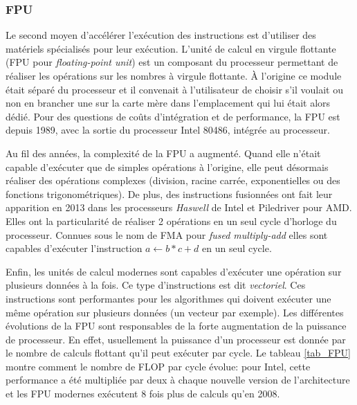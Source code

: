 \subsubsection{FPU}\label{sec:fpu}

Le second moyen d'accélérer l'exécution des instructions est d'utiliser des matériels spécialisés pour leur exécution. L'unité de calcul en virgule flottante (FPU pour \textit{floating-point  unit}) est un composant du processeur permettant de réaliser les opérations sur les nombres à virgule flottante. À l'origine ce module était séparé du processeur et il convenait à l'utilisateur de choisir s’il voulait ou non en brancher une sur la carte mère dans l'emplacement qui lui était alors dédié. Pour des questions de coûts d'intégration et de performance, la FPU est depuis 1989, avec la sortie du processeur Intel 80486,  intégrée au processeur. 

Au fil des années, la complexité de la FPU a augmenté. Quand elle n'était capable d'exécuter que de simples opérations à l'origine, elle peut désormais réaliser des opérations complexes (division, racine carrée, exponentielles ou des fonctions trigonométriques).  De plus, des instructions fusionnées ont fait leur apparition en 2013 dans les processeurs \textit{Haswell} de Intel et Piledriver pour AMD. Elles ont la particularité de réaliser 2 opérations en un seul cycle d'horloge du processeur. Connues sous le nom de FMA pour \textit{fused multiply-add} elles sont capables d'exécuter l'instruction $a \leftarrow b * c + d$ en un seul cycle. 

Enfin, les unités de calcul modernes sont capables d'exécuter une opération sur plusieurs données à la fois. Ce type d'instructions est dit \textit{vectoriel}. Ces instructions sont performantes pour les algorithmes qui doivent exécuter une même opération sur plusieurs données (un vecteur par exemple).
Les différentes évolutions de la FPU sont responsables de la forte augmentation de la puissance de processeur. En effet, usuellement la puissance d'un processeur est donnée par le nombre de calculs flottant qu'il peut exécuter par cycle. Le tableau \ref{tab_FPU} montre comment le nombre de FLOP par cycle évolue: pour Intel, cette performance a été multipliée par deux à chaque nouvelle version de l'architecture et les FPU modernes exécutent 8 fois plus de calculs qu'en 2008.


